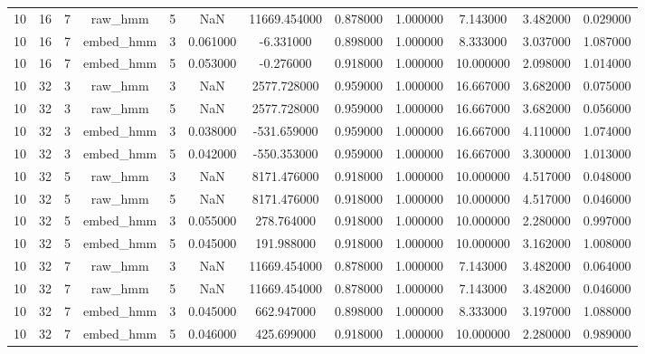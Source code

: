 \begin{table}[htbp]
\begin{tabular}{cccccccccc}
10 & 16 & 7 & raw_hmm & 5 & NaN & 11669.454000 & 0.878000 & 1.000000 & 7.143000 & 3.482000 & 0.029000 \\
10 & 16 & 7 & embed_hmm & 3 & 0.061000 & -6.331000 & 0.898000 & 1.000000 & 8.333000 & 3.037000 & 1.087000 \\
10 & 16 & 7 & embed_hmm & 5 & 0.053000 & -0.276000 & 0.918000 & 1.000000 & 10.000000 & 2.098000 & 1.014000 \\
10 & 32 & 3 & raw_hmm & 3 & NaN & 2577.728000 & 0.959000 & 1.000000 & 16.667000 & 3.682000 & 0.075000 \\
10 & 32 & 3 & raw_hmm & 5 & NaN & 2577.728000 & 0.959000 & 1.000000 & 16.667000 & 3.682000 & 0.056000 \\
10 & 32 & 3 & embed_hmm & 3 & 0.038000 & -531.659000 & 0.959000 & 1.000000 & 16.667000 & 4.110000 & 1.074000 \\
10 & 32 & 3 & embed_hmm & 5 & 0.042000 & -550.353000 & 0.959000 & 1.000000 & 16.667000 & 3.300000 & 1.013000 \\
10 & 32 & 5 & raw_hmm & 3 & NaN & 8171.476000 & 0.918000 & 1.000000 & 10.000000 & 4.517000 & 0.048000 \\
10 & 32 & 5 & raw_hmm & 5 & NaN & 8171.476000 & 0.918000 & 1.000000 & 10.000000 & 4.517000 & 0.046000 \\
10 & 32 & 5 & embed_hmm & 3 & 0.055000 & 278.764000 & 0.918000 & 1.000000 & 10.000000 & 2.280000 & 0.997000 \\
10 & 32 & 5 & embed_hmm & 5 & 0.045000 & 191.988000 & 0.918000 & 1.000000 & 10.000000 & 3.162000 & 1.008000 \\
10 & 32 & 7 & raw_hmm & 3 & NaN & 11669.454000 & 0.878000 & 1.000000 & 7.143000 & 3.482000 & 0.064000 \\
10 & 32 & 7 & raw_hmm & 5 & NaN & 11669.454000 & 0.878000 & 1.000000 & 7.143000 & 3.482000 & 0.046000 \\
10 & 32 & 7 & embed_hmm & 3 & 0.045000 & 662.947000 & 0.898000 & 1.000000 & 8.333000 & 3.197000 & 1.088000 \\
10 & 32 & 7 & embed_hmm & 5 & 0.046000 & 425.699000 & 0.918000 & 1.000000 & 10.000000 & 2.280000 & 0.989000 \\
\bottomrule
\end{tabular}
\end{table}
